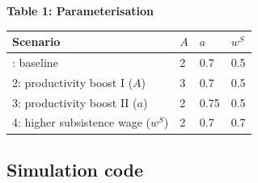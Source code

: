 \documentclass[
  letterpaper,
  DIV=11,
  numbers=noendperiod]{scrreprt}
\begin{document}
\textbf{Table 1: Parameterisation}

\begin{longtable}[]{@{}llll@{}}
\toprule\noalign{}
Scenario & \(A\) & \(a\) & \(w^S\) \\
\midrule\noalign{}
\endhead
\bottomrule\noalign{}
\endlastfoot
1: baseline & 2 & 0.7 & 0.5 \\
2: productivity boost I (\(A\)) & 3 & 0.7 & 0.5 \\
3: productivity boost II (\(a\)) & 2 & 0.75 & 0.5 \\
4: higher subsistence wage (\(w^S\)) & 2 & 0.7 & 0.7 \\
\end{longtable}

\subsection{Simulation code}\label{simulation-code-10}
\end{document}
